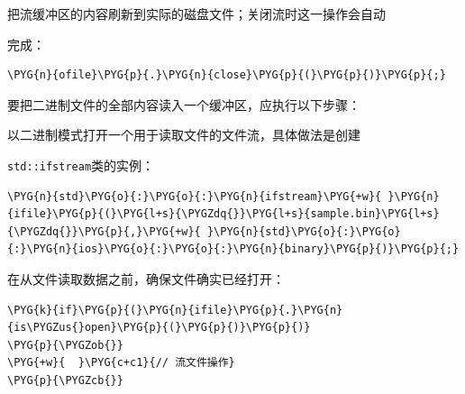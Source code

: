 
把流缓冲区的内容刷新到实际的磁盘文件；关闭流时这一操作会自动



完成：



\begin{codeblockbg}
\begin{Verbatim}[commandchars=\\\{\},breaklines=true,breakanywhere=true,fontsize=\codefont,xleftmargin=17bp]
\PYG{n}{ofile}\PYG{p}{.}\PYG{n}{close}\PYG{p}{(}\PYG{p}{)}\PYG{p}{;}
\end{Verbatim}
\end{codeblockbg}



要把二进制文件的全部内容读入一个缓冲区，应执行以下步骤：



以二进制模式打开一个用于读取文件的文件流，具体做法是创建



\texttt{std::\allowbreak{}ifstream}类的实例：



\begin{codeblockbg}
\begin{Verbatim}[commandchars=\\\{\},breaklines=true,breakanywhere=true,fontsize=\codefont,xleftmargin=17bp]
\PYG{n}{std}\PYG{o}{:}\PYG{o}{:}\PYG{n}{ifstream}\PYG{+w}{ }\PYG{n}{ifile}\PYG{p}{(}\PYG{l+s}{\PYGZdq{}}\PYG{l+s}{sample.bin}\PYG{l+s}{\PYGZdq{}}\PYG{p}{,}\PYG{+w}{ }\PYG{n}{std}\PYG{o}{:}\PYG{o}{:}\PYG{n}{ios}\PYG{o}{:}\PYG{o}{:}\PYG{n}{binary}\PYG{p}{)}\PYG{p}{;}
\end{Verbatim}
\end{codeblockbg}



在从文件读取数据之前，确保文件确实已经打开：



\begin{codeblockbg}
\begin{Verbatim}[commandchars=\\\{\},breaklines=true,breakanywhere=true,fontsize=\codefont,xleftmargin=17bp]
\PYG{k}{if}\PYG{p}{(}\PYG{n}{ifile}\PYG{p}{.}\PYG{n}{is\PYGZus{}open}\PYG{p}{(}\PYG{p}{)}\PYG{p}{)}
\PYG{p}{\PYGZob{}}
\PYG{+w}{  }\PYG{c+c1}{// 流文件操作}
\PYG{p}{\PYGZcb{}}
\end{Verbatim}
\end{codeblockbg}


